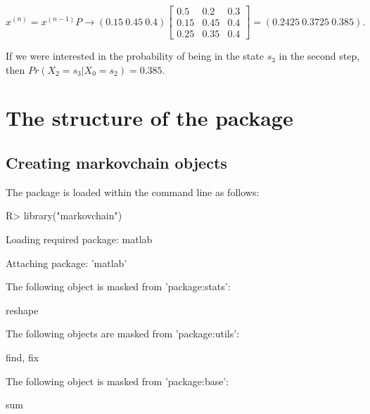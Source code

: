\documentclass[
  nojss]{jss}
\begin{document}
\begin{equation}
x^{(n)}=x^{(n-1)}P \to \left(0.15\:0.45\:0.4\right)\left[\begin{array}{ccc}
0.5 & 0.2 & 0.3\\
0.15 & 0.45 & 0.4\\
0.25 & 0.35 & 0.4
\end{array}\right]=\left(0.2425\:0.3725\:0.385\right).
\label{eq:trPropExEx3}
\end{equation}

If we were interested in the probability of being in the state \(s_{3}\) in the second step, then \(Pr\left(X_{2}=s_{3}\left|X_{0}=s_{2}\right.\right)=0.385\).

\newpage

\hypertarget{sec:structure}{%
\section{The structure of the package}\label{sec:structure}}

\hypertarget{creating-markovchain-objects}{%
\subsection{Creating markovchain objects}\label{creating-markovchain-objects}}

The package is loaded within the  command line as follows:

\begin{CodeChunk}

\begin{CodeInput}
R> library("markovchain")
\end{CodeInput}
\end{CodeChunk}

\begin{CodeChunk}

\begin{CodeOutput}
Loading required package: matlab
\end{CodeOutput}

\begin{CodeOutput}

Attaching package: 'matlab'
\end{CodeOutput}

\begin{CodeOutput}
The following object is masked from 'package:stats':

    reshape
\end{CodeOutput}

\begin{CodeOutput}
The following objects are masked from 'package:utils':

    find, fix
\end{CodeOutput}

\begin{CodeOutput}
The following object is masked from 'package:base':

    sum
\end{CodeOutput}
\end{CodeChunk}
\end{document}
